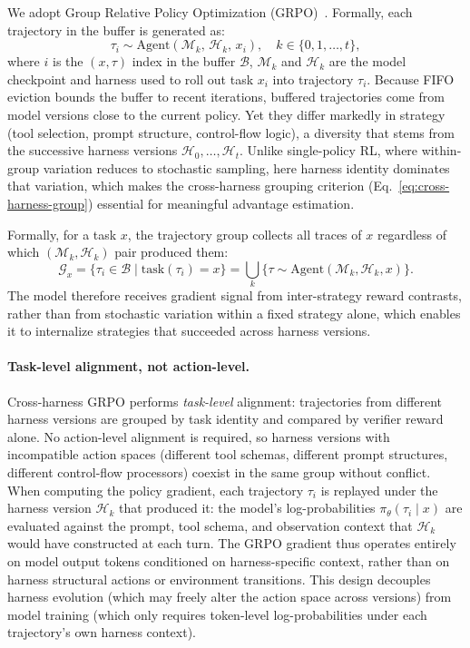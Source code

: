 We adopt Group Relative Policy Optimization (GRPO)~\cite{shao2024deepseekmath}. Formally, each trajectory in the buffer is generated as:
\begin{equation}
    \tau_i \sim \text{Agent}(\mathcal{M}_k,\, \mathcal{H}_k,\, x_i), \quad k \in \{0, 1, \ldots, t\},
  \label{eq:trajectory-generation}
\end{equation}
where $i$ is the $(x, \tau)$ index in the buffer $\mathcal{B}$, $\mathcal{M}_k$ and $\mathcal{H}_k$ are the model checkpoint and harness used to roll out task $x_i$ into trajectory $\tau_i$. Because FIFO eviction bounds the buffer to recent iterations, buffered trajectories come from model versions close to the current policy. Yet they differ markedly in strategy (tool selection, prompt structure, control-flow logic), a diversity that stems from the successive harness versions $\mathcal{H}_0, \ldots, \mathcal{H}_t$. Unlike single-policy RL, where within-group variation reduces to stochastic sampling, here harness identity dominates that variation, which makes the cross-harness grouping criterion (Eq.~\ref{eq:cross-harness-group}) essential for meaningful advantage estimation.

Formally, for a task $x$, the trajectory group collects all traces of $x$ regardless of which $(\mathcal{M}_k, \mathcal{H}_k)$ pair produced them:
\begin{equation}
  \mathcal{G}_x = \{\tau_i \in \mathcal{B} \mid \text{task}(\tau_i) = x\} = \bigcup_{k} \{\tau \sim \text{Agent}(\mathcal{M}_k, \mathcal{H}_k, x)\}.
  \label{eq:cross-harness-group}
\end{equation}
The model therefore receives gradient signal from inter-strategy reward contrasts, rather than from stochastic variation within a fixed strategy alone, which enables it to internalize strategies that succeeded across harness versions.

\paragraph{Task-level alignment, not action-level.}
Cross-harness GRPO performs \textit{task-level} alignment: trajectories from different harness versions are grouped by task identity and compared by verifier reward alone. No action-level alignment is required, so harness versions with incompatible action spaces (different tool schemas, different prompt structures, different control-flow processors) coexist in the same group without conflict. When computing the policy gradient, each trajectory $\tau_i$ is replayed under the harness version $\mathcal{H}_k$ that produced it: the model's log-probabilities $\pi_\theta(\tau_i \mid x)$ are evaluated against the prompt, tool schema, and observation context that $\mathcal{H}_k$ would have constructed at each turn. The GRPO gradient thus operates entirely on model output tokens conditioned on harness-specific context, rather than on harness structural actions or environment transitions. This design decouples harness evolution (which may freely alter the action space across versions) from model training (which only requires token-level log-probabilities under each trajectory's own harness context).

